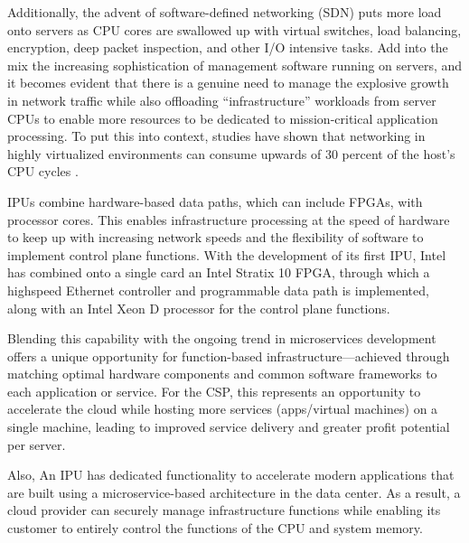 \documentclass[../sn.tex]{subfiles}
\begin{document}
Additionally, the advent of software-defined networking (SDN)
puts more load onto servers as CPU cores are swallowed up with
virtual switches, load balancing, encryption, deep packet
inspection, and other I/O intensive tasks.
Add into the mix the increasing sophistication of management
software running on servers, and it becomes evident that there
is a genuine need to manage the explosive growth in network
traffic while also offloading “infrastructure” workloads from
server CPUs to enable more resources to be dedicated to
mission-critical application processing.
To put this into context, studies have shown that networking in
highly virtualized environments can consume upwards of 30
percent of the host's CPU cycles \cite{evaleng}.

IPUs combine hardware-based data paths, which can include
FPGAs, with processor cores. This enables infrastructure processing
at the speed of hardware to keep up with increasing network speeds
and the flexibility of software to implement control plane functions.
With the development of its first IPU, Intel has combined onto a
single card an Intel Stratix 10 FPGA, through which a highspeed Ethernet
controller and programmable data path is implemented, along with an Intel
Xeon D processor for the control plane functions.

Blending this capability with the ongoing trend in microservices
development offers a unique opportunity for function-based
infrastructure—achieved through matching optimal hardware
components and common software frameworks to each
application or service. For the CSP, this represents an opportunity 
to accelerate the cloud while hosting more services (apps/virtual machines) 
on a single machine, leading to improved service delivery and greater
profit potential per server.

Also, An IPU has dedicated functionality to accelerate modern applications 
that are built using a microservice-based architecture in the data center.
As a result, a cloud provider can securely manage infrastructure functions 
while enabling its customer to entirely control the functions of the CPU and system memory. 
\end{document}
